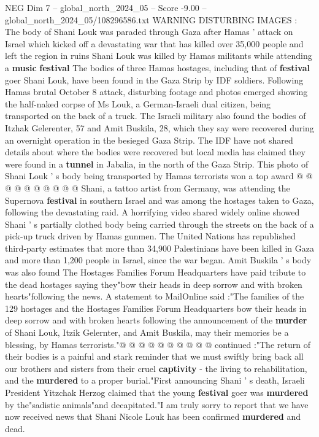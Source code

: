 \begin{textsample}{NEG Dim 7 – global\_north\_2024\_05 – Score -9.00 – global\_north\_2024\_05/108296586.txt}  \label{ex:f7_neg_183}
WARNING DISTURBING IMAGES : The body of Shani Louk was paraded through Gaza after Hamas ' attack on Israel which kicked off a devastating war that has killed over 35,000 people and left the region in ruins Shani Louk was killed by Hamas militants while attending a \textbf{music} \textbf{festival} The bodies of three Hamas hostages, including that of \textbf{festival} goer Shani Louk, have been found in the Gaza Strip by IDF soldiers.
Following Hamas brutal October 8 attack, disturbing footage and photos emerged showing the half-naked corpse of Ms Louk, a German-Israeli dual citizen, being transported on the back of a truck.
The Israeli military also found the bodies of Itzhak Gelerenter, 57 and Amit Buskila, 28, which they say were recovered during an overnight operation in the besieged Gaza Strip.
The IDF have not shared details about where the bodies were recovered but local media has claimed they were found in a \textbf{tunnel} in Jabalia, in the north of the Gaza Strip.
This photo of Shani Louk ' s body being transported by Hamas terrorists won a top award @ @ @ @ @ @ @ @ @ @ Shani, a tattoo artist from Germany, was attending the Supernova \textbf{festival} in southern Israel and was among the hostages taken to Gaza, following the devastating raid.
A horrifying video shared widely online showed Shani ' s partially clothed body being carried through the streets on the back of a pick-up truck driven by Hamas gunmen.
The United Nations has republished third-party estimates that more than 34,900 Palestinians have been killed in Gaza and more than 1,200 people in Israel, since the war began.
Amit Buskila ' s body was also found The Hostages Families Forum Headquarters have paid tribute to the dead hostages saying they"bow their heads in deep sorrow and with broken hearts"following the news.
A statement to MailOnline said :"The families of the 129 hostages and the Hostages Families Forum Headquarters bow their heads in deep sorrow and with broken hearts following the announcement of the \textbf{murder} of Shani Louk, Itzik Gelernter, and Amit Buskila, may their memories be a blessing, by Hamas terrorists."@ @ @ @ @ @ @ @ @ @ continued :"The return of their bodies is a painful and stark reminder that we must swiftly bring back all our brothers and sisters from their cruel \textbf{captivity} - the living to rehabilitation, and the \textbf{murdered} to a proper burial."First announcing Shani ' s death, Israeli President Yitzchak Herzog claimed that the young \textbf{festival} goer was \textbf{murdered} by the"sadistic animals"and decapitated."I am truly sorry to report that we have now received news that Shani Nicole Louk has been confirmed \textbf{murdered} and dead.

\end{textsample}
